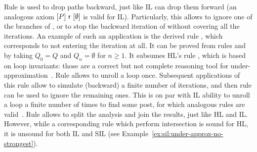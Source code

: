 Rule  is used to drop paths backward, just like IL can drop them forward (an analogous axiom $[P]~\mathsf{r}~[\emptyset]$ is valid for IL). Particularly, this allows to ignore one of the branches of , or to stop the backward iteration of  without covering all the iterations. An example of such an application is the derived rule , which corresponds to not entering the iteration at all. It can be proved from rules  and  by taking $Q_0 = Q$ and $Q_n = \emptyset$ for $n \ge 1$. It subsumes HL's rule , which is based on loop invariants: those are a correct but not complete reasoning tool for under\hyp{}approximation~\cite{OHearn20}.
Rule  allows to unroll a loop once. Subsequent applications of this rule allow to simulate (backward) a finite number of iterations, and then rule  can be used to ignore the remaining ones. This is on par with IL ability to unroll a loop a finite number of times to find some post, for which analogous rules are valid~\cite{OHearn20,MOH21}.
Rule  allows to split the analysis and join the results, just like HL and IL. However, while a corresponding rule  which perform intersection is sound for HL, it is unsound for both IL and SIL (see Example~\ref{ex:sil:under-approx-no-strongest}).

